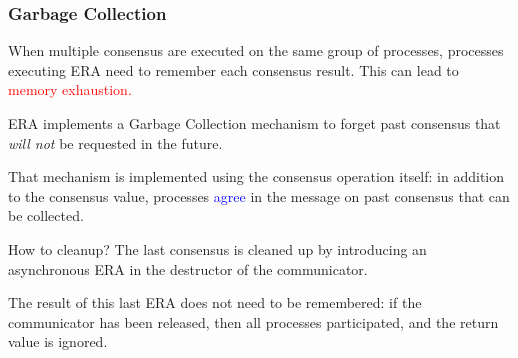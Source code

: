 \begin{frame}[fragile,t]
\begin{center}
\end{center}





\end{frame}

\begin{frame}
  \frametitle{Garbage Collection}

  When \textcolor{red!50}{multiple} consensus are executed on the same group
  of processes, processes executing ERA need to remember
  \textcolor{red!75}{each} consensus result. This can lead to
  \textcolor{red}{memory exhaustion.}

  ERA implements a \textcolor{green!60!black}{Garbage Collection}
  mechanism to \textcolor{green!60!black}{forget} past consensus that
  \emph{will not} be requested in the future.

  That mechanism is implemented using the consensus operation itself:
  in addition to the consensus value, processes
  \textcolor{blue}{agree} in the \msgDECIDE{} message on past
  consensus that can be collected.

\medskip

  \begin{beamerboxesrounded}{How to cleanup?}
    The last consensus is cleaned up by introducing an asynchronous
    ERA in the destructor of the communicator.

    The result of this last ERA does not need to be remembered: if the
    communicator has been released, then all processes participated,
    and the return value is ignored.
  \end{beamerboxesrounded}

\end{frame}

